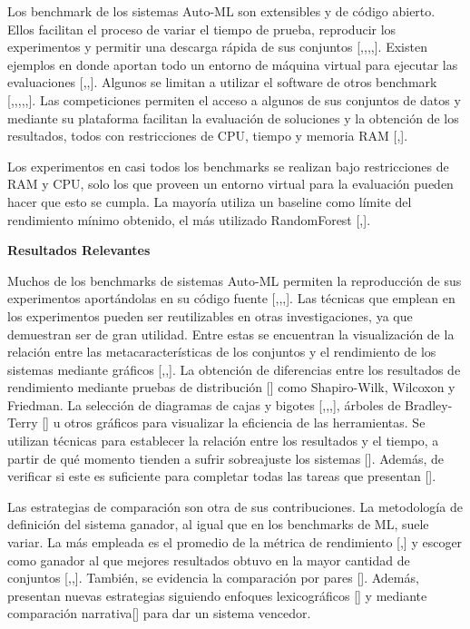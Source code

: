 Los benchmark de los sistemas Auto-ML son extensibles y de código abierto. Ellos facilitan el proceso de variar el tiempo de 
prueba, reproducir los experimentos y permitir una descarga rápida de sus conjuntos [\cite{10},\cite{15},\cite{31},\cite{28},\cite{23}].
Existen ejemplos en donde aportan todo un entorno de máquina virtual para ejecutar las evaluaciones [\cite{10},\cite{15},\cite{31}]. Algunos se limitan a 
utilizar el software de otros benchmark [\cite{17},\cite{21},\cite{20},\cite{26},\cite{32},\cite{19}]. Las 
competiciones permiten el acceso a algunos de sus conjuntos de datos y mediante su plataforma facilitan la evaluación de soluciones y la 
obtención de los resultados, todos con restricciones de CPU, tiempo y memoria RAM [\cite{11},\cite{29}].

Los experimentos en casi todos los benchmarks se realizan bajo restricciones de RAM y CPU, solo los que proveen un entorno virtual para la evaluación 
pueden hacer que esto se cumpla. La mayoría utiliza un baseline como límite del rendimiento mínimo obtenido, el más utilizado RandomForest [\cite{31},\cite{29}].

\begin{flushleft} 
    {\large { \textbf{Resultados Relevantes}}}\label{subsection:result Auto-ML}
\end{flushleft}

Muchos de los benchmarks de sistemas Auto-ML permiten la reproducción de sus experimentos aportándolas en su código fuente [\cite{10},\cite{15},\cite{31},\cite{23}]. 
Las técnicas que emplean en los experimentos pueden ser reutilizables en otras investigaciones, ya que demuestran ser de gran utilidad. Entre estas se 
encuentran la visualización de la relación entre las metacaracterísticas de los conjuntos y el rendimiento de los sistemas mediante gráficos [\cite{10},\cite{26},\cite{30}]. 
La obtención de diferencias entre los resultados de rendimiento mediante pruebas de distribución [\cite{18}] como Shapiro-Wilk, Wilcoxon y Friedman. La selección de 
diagramas de cajas y bigotes [\cite{10},\cite{31},\cite{16},\cite{22}], árboles de Bradley-Terry [\cite{31}] u otros gráficos para visualizar la eficiencia de las 
herramientas. Se utilizan técnicas para establecer la relación entre los resultados y el tiempo, a partir de qué momento tienden a sufrir sobreajuste los 
sistemas [\cite{15}]. Además, de verificar si este es suficiente para completar todas las tareas que presentan [\cite{29}].

Las estrategias de comparación son otra de sus contribuciones. La metodología de definición del sistema ganador, al igual que en los benchmarks de ML, suele variar. 
La más empleada es el promedio de la métrica de rendimiento [\cite{15},\cite{31}] y escoger como ganador al que mejores resultados obtuvo en la mayor cantidad de 
conjuntos [\cite{10},\cite{9},\cite{18}]. También, se evidencia la comparación por pares [\cite{10}]. Además, presentan nuevas estrategias siguiendo enfoques 
lexicográficos [\cite{25}] y mediante comparación narrativa[\cite{14}] para dar un sistema vencedor.

